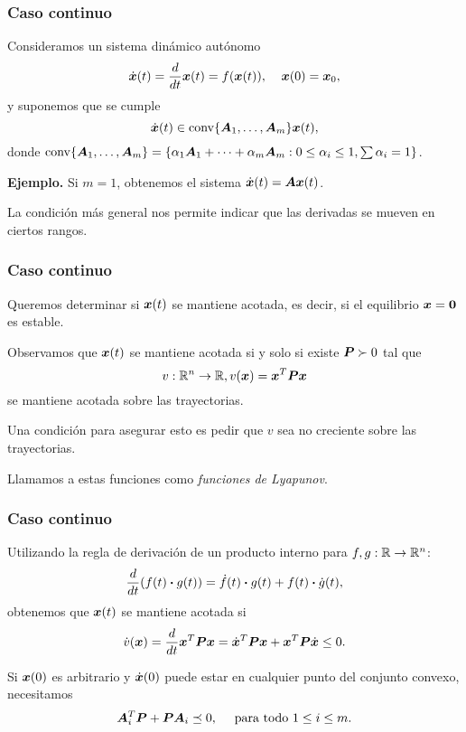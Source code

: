 \documentclass[aspectratio=169,12pt,spanish]{beamer}
\begin{document}

\begin{frame}
\frametitle{Caso continuo}

Consideramos un sistema dinámico autónomo
$$
\dot{\bm{x}}(t) = \frac{d}{dt}{\bm{x}(t)} =f(\bm{x}(t)),\;\;\;\;\bm{x}(0)=\bm{x}_{0},
$$
y suponemos que se cumple
$$
\dot{\bm{x}}(t)  \in \operatorname{conv}\{\bm{A}_1, \dots, \bm{A}_m\} \bm{x}(t),
$$
donde $\operatorname{conv}\{\bm{A}_1, \dots, \bm{A}_m\} = \{\alpha_1 \bm{A}_1 + \dots + \alpha_m \bm{A}_m : 0 \le \alpha_i \le 1, \sum \alpha_i = 1\}$.

\textbf{Ejemplo.} Si $m = 1$, obtenemos el sistema $\dot{\bm{x}}(t) = \bm{A} \bm{x}(t)$.

La condición más general nos permite indicar que las derivadas se mueven en ciertos rangos.


\end{frame}


\begin{frame}
\frametitle{Caso continuo}

Queremos determinar si $\bm{x}(t)$ se mantiene acotada, es decir, si el equilibrio $\bm{x} = \bm{0}$ es estable.

Observamos que $\bm{x}(t)$ se mantiene acotada si y solo si existe $\bm{P} \succ 0$ tal que
$$
v: \mathbb{R}^n \rightarrow \mathbb{R}, v(\bm{x}) = \bm{x}^T \bm{P} \bm{x}
$$
se mantiene acotada sobre las trayectorias.

Una condición para asegurar esto es pedir que $v$ sea no creciente sobre las trayectorias.

Llamamos a estas funciones como \emph{funciones de Lyapunov}.
\end{frame}


\begin{frame}
\frametitle{Caso continuo}

Utilizando la regla de derivación de un producto interno para $f, g: \mathbb{R} \rightarrow \mathbb{R}^n$:
$$\frac{d}{dt}(f(t) \boldsymbol{\cdot} g(t)) = \dot f(t) \boldsymbol{\cdot} g(t) + f(t) \boldsymbol{\cdot} \dot g(t),$$
obtenemos que $\bm{x}(t)$ se mantiene acotada si
$$
\dot v(\bm{x}) = \frac{d}{dt}\bm{x}^T \bm{P} \bm{x} = \dot{\bm{x}}^T \bm{P} \bm{x} +  {\bm{x}}^T \bm{P} \dot{\bm{x}} \le 0.
$$

Si $\bm{x}(0)$ es arbitrario y $\dot {\bm{x}}(0)$ puede estar en cualquier punto del conjunto convexo, necesitamos
$$
\bm{A}_i^T \bm{P} + \bm{P} \bm{A}_i \preceq 0, \quad \text{ para todo } 1 \le i \le m.
$$


\end{frame}
\end{document}
